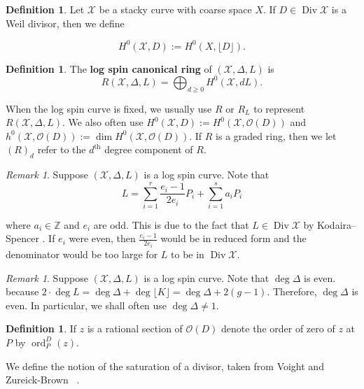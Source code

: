 \documentclass{amsart}
\theoremstyle{plain}
\theoremstyle{definition}
\newtheorem{defn}[thm]{Definition}
\theoremstyle{remark}
\newtheorem{rem}[thm]{Remark}
\numberwithin{equation}{section}
\newcommand\BZ{{\mathbb Z}}
\newcommand \sx{\mathscr X}
\newcommand\sco{{\mathscr O}}
\DeclareMathOperator\di{Div}
\DeclareMathOperator{\ord}{ord}
\newcommand \subhalf[1]{\frac{{#1} - 1}{2{#1}}}
\newcommand{\halfcan}{L}
\begin{document}
\begin{defn}
\label{defn:h0-stacky}
Let $\sx$ be a stacky curve with coarse space $X$.
If $D \in \di \sx$ is a Weil divisor, then we define

\[
	H^0(\sx, D) := H^0(X, \lfloor D \rfloor).
\]
\end{defn}

\begin{defn}
\label{defn:log-spin-canonical-ring}
The {\bf log spin canonical ring} of $(\sx, \Delta, \halfcan)$ is
\[
	R(\sx, \Delta, \halfcan) = \bigoplus_{d \geq 0} H^0(\sx, d \halfcan).
\]
\end{defn}

\noindent
When the log spin curve is fixed, we usually use $R$ or $R_L$ to
represent $R(\sx, \Delta, \halfcan)$. We also often use $H^0(\sx, D)
:= H^0(\sx, \sco(D))$ and $h^0(\sx, \sco(D)) := \dim H^0(\sx, \sco(D))$.
If $R$ is a graded ring, then we let $(R)_d$ refer to the $d^\text{th}$
degree component of $R$.


\begin{rem}
\label{rem:odd-denom}
Suppose $(\sx, \Delta, L)$ is a log spin curve. Note that
\[
	\halfcan = \sum_{i = 1}^{r} \subhalf{e_i} P_i + \sum_{i = 1}^{s} a_i P_i
\]

\noindent
where $a_i \in \BZ$ and $e_i$ are odd. This is due to the fact
that $\halfcan \in \di \sx$ by Kodaira--Spencer
\cite{kodaira-spencer:deformations}. If $e_i$ were even,
then $\frac{e_i - 1}{2e_i}$ would be in reduced form and
the denominator would be too large for $\halfcan$ to be
in $\di \sx$.
\end{rem}
	
\begin{rem}
\label{rem:delta-not-1}
Suppose $(\sx, \Delta, \halfcan)$ is a log spin curve. Note that $\deg \Delta$
is even. because $2 \cdot \deg \halfcan = \deg \Delta + \deg \lfloor K
\rfloor = \deg \Delta + 2(g-1).$ Therefore, $\deg \Delta$ is even.
In particular, we shall often use $\deg \Delta \neq 1$.
\end{rem}

\begin{defn}
\label{def:order-sup}
If $z$ is a rational section of $\sco(D)$ denote the order of
zero of $z$ at $P$ by $\ord_P^D(z)$.
\end{defn}

We define the notion of the saturation of a divisor, taken from
Voight and Zureick-Brown ~\cite[Section 7.2]{vzb:stacky}.
\end{document}
